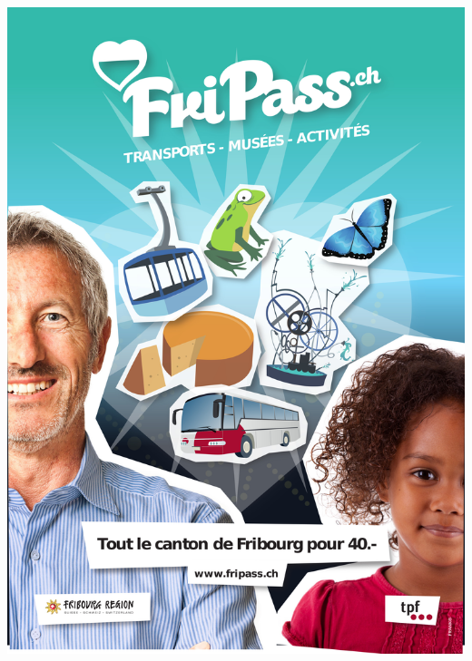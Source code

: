 \clearpage
\thispagestyle{empty}%
{\centering
\includegraphics[width=\textwidth]{fripass.jpg}
\par
}
\clearpage
\thispagestyle{empty}%
